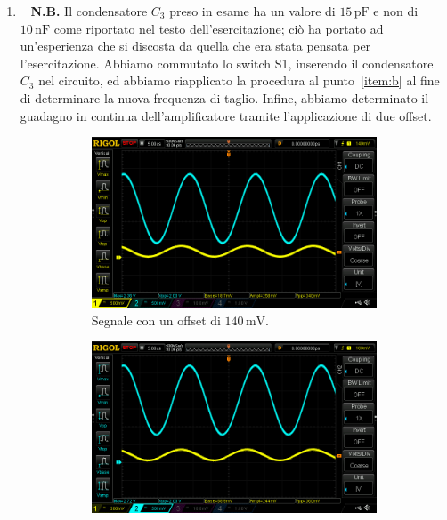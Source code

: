 \documentclass[a4paper]{article}
\begin{document}
\begin{enumerate}[label=\alph*.]
\begin{figure}[h!]
\begin{subfigure}{0.4\textwidth}
							\caption{Segnale con un offset di $ 180 \, \mathrm{mV} $.}
						\end{subfigure}
						\label{fig:punto2.4.3.c}
					\end{figure}
				\item \ 
					\newline
					\textbf{N.B.} Il condensatore $ C_{3} $ preso in esame ha un valore di $ 15 \, \mathrm{pF} $ e non di $ 10 \, \mathrm{nF} $ come riportato nel testo dell'esercitazione; ciò ha portato ad un'esperienza che si discosta da quella che era stata pensata per l'esercitazione.
					\newline
					\newline
					Abbiamo commutato lo switch S1, inserendo il condensatore $ C_{3} $ nel circuito, ed abbiamo riapplicato la procedura al punto~\ref{item:b} al fine di determinare la nuova frequenza di taglio.
					\newline
					Infine, abbiamo determinato il guadagno in continua dell'amplificatore tramite l'applicazione di due offset.
					\begin{figure}[h!]
						\centering
						\begin{subfigure}{0.4\textwidth}
							\centering
							\includegraphics[scale=0.2]{offset140C3}
							\caption{Segnale con un offset di $ 140 \, \mathrm{mV} $.}
						\end{subfigure}
						\begin{subfigure}{0.4\textwidth}
							\centering
							\includegraphics[scale=0.2]{offset180C3}

\end{subfigure}
\end{figure}
\end{enumerate}
\end{document}

